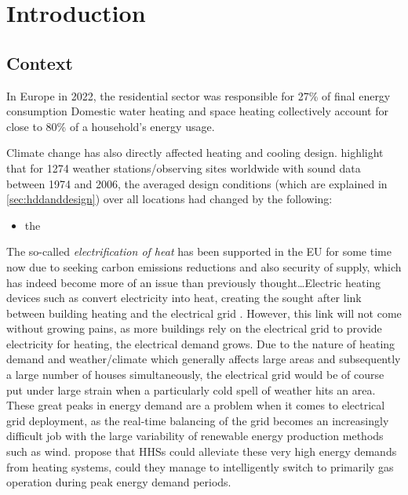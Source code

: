 \chapter{Introduction}\label{ch:intro}



\section{Context}\label{sec:context}

In Europe in 2022, the  residential sector was responsible for 27\% of final energy consumption \cite{eurostat_final_2018}
Domestic water heating and space heating collectively account for close to 80\% of a household's energy usage. \cite{eurostat_energy_2020}

Climate change has also directly affected heating and cooling design.  highlight that for \num{1274} weather stations/observing sites worldwide with sound data between 1974 and 2006, the averaged design conditions (which are explained in \cref{sec:hddanddesign}) over all locations had changed by the following:
\begin{itemize}
    \item the 
\end{itemize}

The so-called \textit{electrification of heat} has been supported in the EU for some time now due to seeking carbon emissions reductions and also security of supply, which has indeed become more of an issue than previously thought\dots Electric heating devices such as \HPs convert electricity into heat, creating the sought after link between building heating and the electrical grid \cite{heinen_electricity_2016}. However, this link will not come without growing pains, as more buildings rely on the electrical grid to provide electricity for heating, the electrical demand grows. Due to the nature of heating demand and weather/climate which generally affects large areas and subsequently a large number of houses simultaneously, the electrical grid would be of course put under large strain when a particularly cold spell of weather hits an area. These great peaks in energy demand are a problem when it comes to electrical grid deployment, as the real-time balancing of the grid becomes an increasingly difficult job with the large variability of renewable energy production methods such as wind. \cite{vuillecard_small_2011, thomasen_decarbonisation_2021} propose that \acp{HHS} could alleviate these very high energy demands from heating systems, could they manage to intelligently switch to primarily gas operation during peak energy demand periods. 


